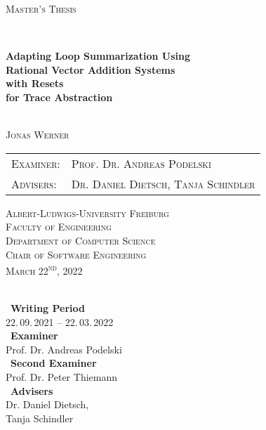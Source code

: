 \begin{titlepage}
	\begin{center}
		
		{\scshape\Large Master's Thesis\par}
		
		
		\HorizontalLine \\[0.4cm]
		{\huge\bfseries Adapting Loop Summarization Using \\ Rational Vector Addition Systems \\ with Resets \\ for Trace Abstraction \par}
		\HorizontalLine \\[1.5cm]
		
		
		{\Large \scshape Jonas Werner}\\[5cm]
		
		
		\begin{tabular}[scshape]{>{\normalsize}l >{\normalsize}l}
			\scshape Examiner: & \scshape Prof. Dr. Andreas Podelski\\[0.3cm]
			\scshape Advisers: & \scshape Dr. Daniel Dietsch, Tanja Schindler  \\[1.2cm]
		\end{tabular}
		\vfill  %
		
		\large { \scshape
			Albert-Ludwigs-University Freiburg\\
			Faculty of Engineering\\
			Department of Computer Science\\
			Chair of Software Engineering \\[1cm]
			
			March 22\textsuperscript{nd}, 2022\\
		}
	\end{center}
\end{titlepage}

\thispagestyle{empty}
\ \vfill \ \\  %
\
\textbf{Writing Period}            \smallskip{} \\
22.\,09.\,2021 -- 22.\,03.\,2022   \bigskip{} \\
\
\textbf{Examiner}                  \smallskip{} \\
Prof. Dr. Andreas Podelski                     \bigskip{} \\
\
\textbf{Second Examiner}                  \smallskip{} \\
Prof. Dr. Peter Thiemann        \bigskip{} \\
\
\textbf{Advisers}                  \smallskip{} \\
Dr. Daniel Dietsch, \\ Tanja Schindler
\pagebreak